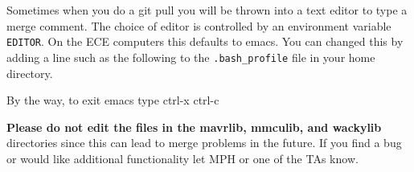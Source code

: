 Sometimes when you do a git pull you will be thrown into a text editor
to type a merge comment. The choice of editor is controlled by an
environment variable \texttt{EDITOR}. On the ECE computers this defaults
to emacs. You can changed this by adding a line such as the following to
the \texttt{.bash\_profile} file in your home directory.

\begin{Shaded}
\begin{Highlighting}[]
 
\end{Highlighting}
\end{Shaded}

By the way, to exit emacs type ctrl-x ctrl-c

\textbf{Please do not edit the files in the mavrlib, mmculib, and
wackylib} directories since this can lead to merge problems in the
future. If you find a bug or would like additional functionality let MPH
or one of the TAs know.

